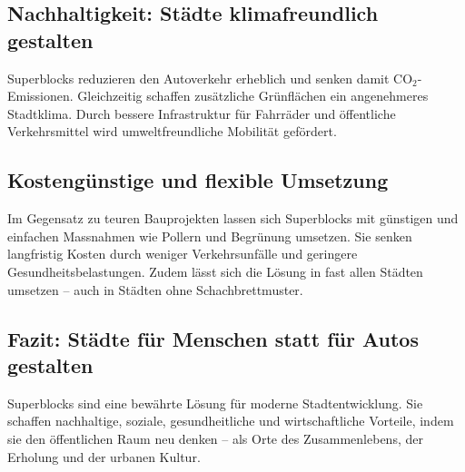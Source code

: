 \begin{tcolorbox}[title=Pro-Argumente,
			parbox=false,
			colback=ForestGreen!10,
			colframe=ForestGreen,
			colbacktitle=ForestGreen]
\subsection*{Nachhaltigkeit: Städte klimafreundlich gestalten}
Superblocks reduzieren den Autoverkehr erheblich und senken damit CO$_2$-Emissionen. Gleichzeitig schaffen zusätzliche Grünflächen ein angenehmeres Stadtklima. Durch bessere Infrastruktur für Fahrräder und öffentliche Verkehrsmittel wird umweltfreundliche Mobilität gefördert.

\subsection*{Kostengünstige und flexible Umsetzung}
Im Gegensatz zu teuren Bauprojekten lassen sich Superblocks mit günstigen und einfachen Massnahmen wie Pollern und Begrünung umsetzen. Sie senken langfristig Kosten durch weniger Verkehrsunfälle und geringere Gesundheitsbelastungen. Zudem lässt sich die Lösung in fast allen Städten umsetzen -- auch in Städten ohne Schachbrettmuster.

\subsection*{Fazit: Städte für Menschen statt für Autos gestalten}
Superblocks sind eine bewährte Lösung für moderne Stadtentwicklung. Sie schaffen nachhaltige, soziale, gesundheitliche und wirtschaftliche Vorteile, indem sie den öffentlichen Raum neu denken -- als Orte des Zusammenlebens, der Erholung und der urbanen Kultur.

\end{tcolorbox}
\newpage

